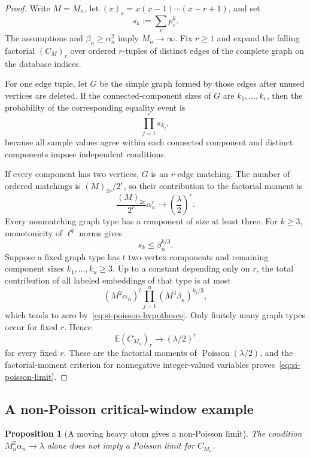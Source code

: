 \documentclass[9pt,twoside]{pnas-new}
\newtheorem{proposition}[theorem]{Proposition}
\theoremstyle{definition}
\theoremstyle{remark}
\begin{document}
\begin{proof}
Write $M=M_n$, let $(x)_r=x(x-1)\cdots(x-r+1)$, and set
\[
s_k:=\sum_vp_v^k.
\]
The assumptions and $\beta_n\ge\alpha_n^2$ imply $M_n\to\infty$. Fix $r\ge1$ and expand the falling factorial $(C_M)_r$ over ordered $r$-tuples of distinct edges of the complete graph on the database indices.

For one edge tuple, let $G$ be the simple graph formed by those edges after unused vertices are deleted. If the connected-component sizes of $G$ are $k_1,\ldots,k_c$, then the probability of the corresponding equality event is
\begin{equation}
\prod_{j=1}^c s_{k_j},
\label{eq:si-component-probability}
\end{equation}
because all sample values agree within each connected component and distinct components impose independent conditions.

If every component has two vertices, $G$ is an $r$-edge matching. The number of ordered matchings is $(M)_{2r}/2^r$, so their contribution to the factorial moment is
\[
\frac{(M)_{2r}}{2^r}\alpha_n^r
\longrightarrow
\left(\frac\lambda2\right)^r.
\]
Every nonmatching graph type has a component of size at least three. For $k\ge3$, monotonicity of $\ell^q$ norms gives
\begin{equation}
s_k\le\beta_n^{k/3}.
\label{eq:si-higher-power-bound}
\end{equation}
Suppose a fixed graph type has $t$ two-vertex components and remaining component sizes $k_1,\ldots,k_u\ge3$. Up to a constant depending only on $r$, the total contribution of all labeled embeddings of that type is at most
\[
(M^2\alpha_n)^t
\prod_{j=1}^u(M^3\beta_n)^{k_j/3},
\]
which tends to zero by~\eqref{eq:si-poisson-hypotheses}. Only finitely many graph types occur for fixed $r$. Hence
\[
\mathbb E(C_{M_n})_r
\longrightarrow
(\lambda/2)^r
\]
for every fixed $r$. These are the factorial moments of
$\operatorname{Poisson}(\lambda/2)$, and the factorial-moment criterion for nonnegative integer-valued variables proves~\eqref{eq:si-poisson-limit}.
\end{proof}

\subsection{A non-Poisson critical-window example}
\begin{proposition}[A moving heavy atom gives a non-Poisson limit]
\label{prop:si-heavy-atom}
The condition $M_n^2\alpha_n\to\lambda$ alone does not imply a Poisson limit for $C_{M_n}$.
\end{proposition}
\end{document}
